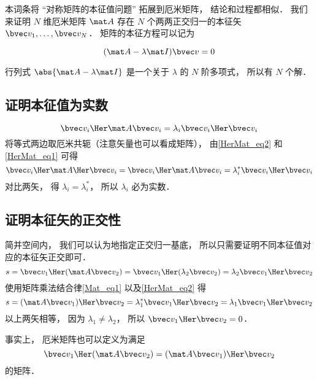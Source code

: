 

本词条将 “对称矩阵的本征值问题” 拓展到厄米矩阵， 结论和过程都相似． 我们来证明 $N$ 维厄米矩阵 $\mat A$ 存在 $N$ 个两两正交归一的本征矢 $\bvec v_1, \dots, \bvec v_N$． 矩阵的本征方程可以记为

\begin{equation}
(\mat A - \lambda \mat I) \bvec v = 0
\end{equation}

行列式 $\abs{\mat A - \lambda \mat I}$ 是一个关于 $\lambda$ 的 $N$ 阶多项式， 所以有 $N$ 个解． %

\subsection{证明本征值为实数}
\begin{equation}
\bvec v_i\Her \mat A \bvec v_i = \lambda_i \bvec v_i\Her \bvec v_i
\end{equation}
将等式两边取厄米共轭（注意矢量也可以看成矩阵）， 由\autoref{HerMat_eq2} 和\autoref{HerMat_eq1} 可得
\begin{equation}
\bvec v_i\Her \mat A\Her \bvec v_i = \bvec v_i\Her \mat A \bvec v_i = \lambda_i^* \bvec v_i\Her \bvec v_i
\end{equation}
对比两矢， 得 $\lambda_i = \lambda_i^*$， 所以 $\lambda_i$ 必为实数．

\subsection{证明本征矢的正交性}
简并空间内， 我们可以认为地指定正交归一基底， 所以只需要证明不同本征值对应的本征矢正交即可．
\begin{equation}
s = \bvec v_1\Her (\mat A \bvec v_2) = \bvec v_1\Her (\lambda_2 \bvec v_2) = \lambda_2 \bvec v_1\Her \bvec v_2
\end{equation}
使用矩阵乘法结合律\autoref{Mat_eq1} 以及\autoref{HerMat_eq2} 得
\begin{equation}
s = (\mat A \bvec v_1)\Her \bvec v_2 = \lambda_1^* \bvec v_1\Her \bvec v_2 = \lambda_1 \bvec v_1\Her \bvec v_2
\end{equation}
以上两矢相等， 因为 $\lambda_1 \ne \lambda_2$， 所以 $\bvec v_1\Her \bvec v_2 = 0$．

事实上， 厄米矩阵也可以定义为满足
\begin{equation}
\bvec v_1\Her (\mat A \bvec v_2) = (\mat A \bvec v_1)\Her \bvec v_2
\end{equation}
的矩阵．
